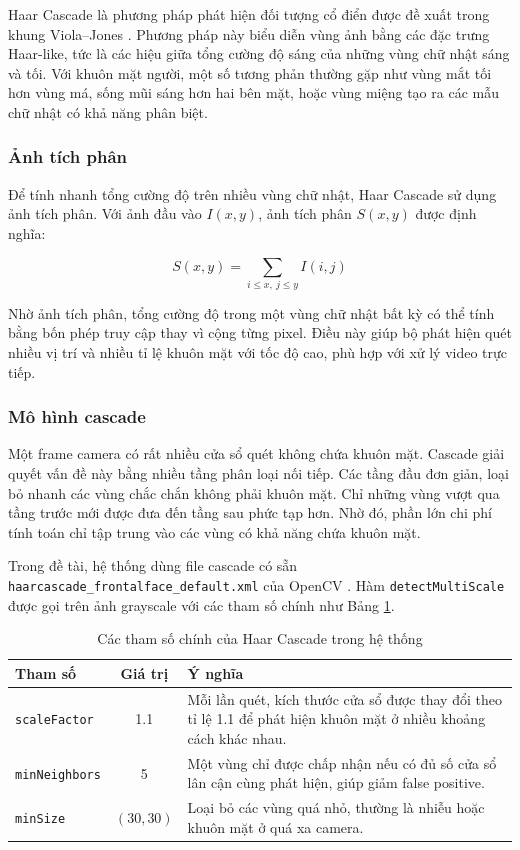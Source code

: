 Haar Cascade là phương pháp phát hiện đối tượng cổ điển được đề xuất trong khung Viola--Jones \cite{viola2001}. Phương pháp này biểu diễn vùng ảnh bằng các đặc trưng Haar-like, tức là các hiệu giữa tổng cường độ sáng của những vùng chữ nhật sáng và tối. Với khuôn mặt người, một số tương phản thường gặp như vùng mắt tối hơn vùng má, sống mũi sáng hơn hai bên mặt, hoặc vùng miệng tạo ra các mẫu chữ nhật có khả năng phân biệt.

\subsubsection{Ảnh tích phân}

Để tính nhanh tổng cường độ trên nhiều vùng chữ nhật, Haar Cascade sử dụng ảnh tích phân. Với ảnh đầu vào $I(x,y)$, ảnh tích phân $S(x,y)$ được định nghĩa:

\begin{equation}
    S(x,y) = \sum_{i \le x,\ j \le y} I(i,j)
\end{equation}

Nhờ ảnh tích phân, tổng cường độ trong một vùng chữ nhật bất kỳ có thể tính bằng bốn phép truy cập thay vì cộng từng pixel. Điều này giúp bộ phát hiện quét nhiều vị trí và nhiều tỉ lệ khuôn mặt với tốc độ cao, phù hợp với xử lý video trực tiếp.

\subsubsection{Mô hình cascade}

Một frame camera có rất nhiều cửa sổ quét không chứa khuôn mặt. Cascade giải quyết vấn đề này bằng nhiều tầng phân loại nối tiếp. Các tầng đầu đơn giản, loại bỏ nhanh các vùng chắc chắn không phải khuôn mặt. Chỉ những vùng vượt qua tầng trước mới được đưa đến tầng sau phức tạp hơn. Nhờ đó, phần lớn chi phí tính toán chỉ tập trung vào các vùng có khả năng chứa khuôn mặt.

Trong đề tài, hệ thống dùng file cascade có sẵn \texttt{haarcascade\_frontalface\_default.xml} của OpenCV \cite{opencv}. Hàm \texttt{detectMultiScale} được gọi trên ảnh grayscale với các tham số chính như Bảng \ref{tab:haar_params}.

\begin{table}[H]
\centering
\caption{Các tham số chính của Haar Cascade trong hệ thống}
\label{tab:haar_params}
\begin{tabular}{|l|c|p{7.5cm}|}
\hline
\textbf{Tham số} & \textbf{Giá trị} & \textbf{Ý nghĩa} \\
\hline
\texttt{scaleFactor} & 1.1 & Mỗi lần quét, kích thước cửa sổ được thay đổi theo tỉ lệ 1.1 để phát hiện khuôn mặt ở nhiều khoảng cách khác nhau. \\
\hline
\texttt{minNeighbors} & 5 & Một vùng chỉ được chấp nhận nếu có đủ số cửa sổ lân cận cùng phát hiện, giúp giảm false positive. \\
\hline
\texttt{minSize} & $(30,30)$ & Loại bỏ các vùng quá nhỏ, thường là nhiễu hoặc khuôn mặt ở quá xa camera. \\
\hline
\end{tabular}
\end{table}

